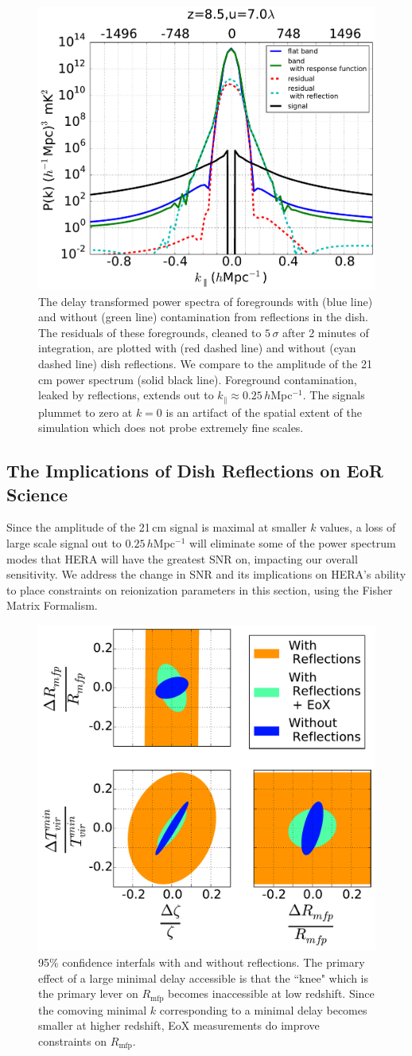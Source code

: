 \documentclass[preprint]{emulateapj}
\begin{document}
\begin{figure}
\centering
\includegraphics[width=.5\textwidth]{figures/resid_5sigma_compare.pdf}
\caption{The delay transformed power spectra of foregrounds with (blue line) and without (green line) contamination from reflections in the dish. The residuals of these foregrounds, cleaned to $5\,\sigma$ after 2 minutes of integration, are plotted with (red dashed line) and without (cyan dashed line) dish reflections. We compare to the amplitude of the 21\,cm power spectrum (solid black line). Foreground contamination, leaked by reflections, extends out to $k_\parallel \approx 0.25$\,$h$Mpc$^{-1}$. The signals plummet to zero at $k=0$ is an artifact of the spatial extent of the simulation which does not probe extremely fine scales.}
\label{fig:SignalCompare}
\end{figure}

\subsection{The Implications of Dish Reflections on EoR Science}
Since the amplitude of the 21\,cm signal is maximal at smaller $k$ values, a loss of large scale signal out to $0.25$\,$h$Mpc$^{-1}$ will eliminate some of the power spectrum modes that HERA will have the greatest SNR on, impacting our overall sensitivity. We address the change in SNR and its implications on HERA's ability to place constraints on reionization parameters in this section, using the Fisher Matrix Formalism. 

\begin{figure}
\includegraphics[width=.5\textwidth]{figures/reionization_triangle_compare.pdf}
\caption{95\% confidence interfals with and without reflections. The primary effect of a large minimal delay accessible is that  the ``knee" which is the primary lever on $R_\text{mfp}$ becomes inaccessible at low redshift. Since the comoving minimal $k$ corresponding to a minimal delay becomes smaller at higher redshift, EoX measurements do improve constraints on $R_\text{mfp}$. }
\end{figure}
\end{document}
